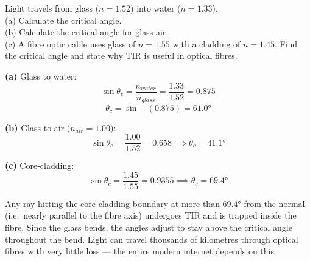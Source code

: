 \begin{diagbox}
\begin{center}
\end{center}
\end{diagbox}

\begin{examplebox}[20.2]
Light travels from glass ($n = 1.52$) into water
($n = 1.33$).\\
(a) Calculate the critical angle.\\
(b) Calculate the critical angle for glass-air.\\
(c) A fibre optic cable uses glass of $n = 1.55$
with a cladding of $n = 1.45$. Find the critical
angle and state why TIR is useful in optical fibres.
\end{examplebox}

\begin{solutionbox}
\textbf{(a)} Glass to water:
\[
  \sin\theta_c = \frac{n_{water}}{n_{glass}}
  = \frac{1.33}{1.52} = 0.875
\]
\[
  \theta_c = \sin^{-1}(0.875) = 61.0°
\]

\textbf{(b)} Glass to air ($n_{air} = 1.00$):
\[
  \sin\theta_c = \frac{1.00}{1.52} = 0.658
  \implies \theta_c = 41.1°
\]

\textbf{(c)} Core-cladding:
\[
  \sin\theta_c = \frac{1.45}{1.55} = 0.9355
  \implies \theta_c = 69.4°
\]

Any ray hitting the core-cladding boundary at more
than $69.4°$ from the normal (i.e.\ nearly parallel
to the fibre axis) undergoes TIR and is trapped
inside the fibre. Since the glass bends, the angles
adjust to stay above the critical angle throughout
the bend. Light can travel thousands of kilometres
through optical fibres with very little loss ---
the entire modern internet depends on this.
\end{solutionbox}

